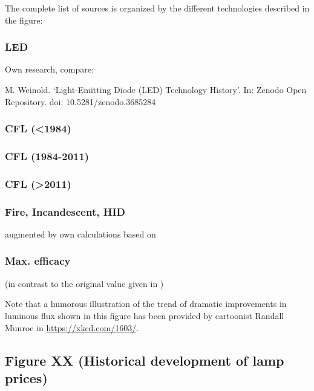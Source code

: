 \documentclass[10pt]{article}
\begin{document}
The complete list of sources is organized by the different technologies described in the figure:

\subsubsection{LED}

Own research, compare:

M. Weinold. ‘Light-Emitting Diode (LED) Technology History’.
In: Zenodo Open Repository. doi: 10.5281/zenodo.3685284 

\subsubsection{CFL (<1984)}

\cite{Bouwknegt1982}\cite{Vrenken1983}

\subsubsection{CFL (1984-2011)}

\cite{eger2018origin}

\subsubsection{CFL (>2011)}

\cite{Guan2015}

\subsubsection{Fire, Incandescent, HID}

\cite{azevedo2009transition} augmented by own calculations based on \cite{benesch1905beleuchtungswesen}

\subsubsection{Max. efficacy}

\cite{Murphy2012} (in contrast to the original value given in \cite{azevedo2009transition})

Note that a humorous illustration of the trend of dramatic improvements in luminous flux shown in this figure has been provided by cartoonist Randall Munroe in \href{https://xkcd.com/1603/}{https://xkcd.com/1603/}.

\subsection{Figure XX (Historical development of lamp prices)}
\end{document}
